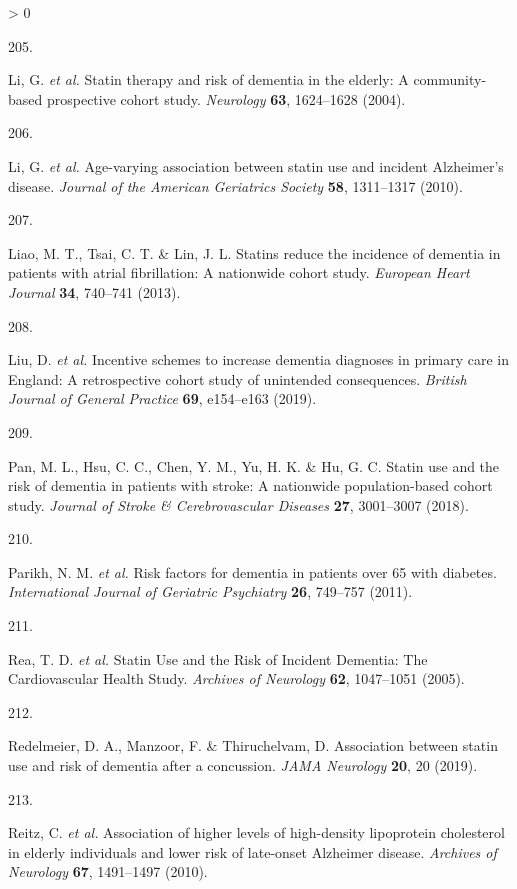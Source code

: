 \documentclass[a4paper, twoside]{templates/ociamthesis}
\newlength{\cslhangindent}
\newlength{\csllabelwidth}
\newenvironment{CSLReferences}[3] %
 {%
  \setlength{\parindent}{0pt}
  \ifodd #1 \everypar{\setlength{\hangindent}{\cslhangindent}}\ignorespaces\fi
  \ifnum #2 > 0
  \setlength{\parskip}{#2\baselineskip}
  \fi
 }%
 {}
\newcommand{\CSLLeftMargin}[1]{\parbox[t]{\maxof{\widthof{#1}}{\csllabelwidth}}{#1}}
\newcommand{\CSLRightInline}[1]{\parbox[t]{\linewidth - \csllabelwidth}{#1}}
\begin{document}
\begin{CSLReferences}{0}{0}
\leavevmode\hypertarget{ref-li2004}{}%
\CSLLeftMargin{205. }
\CSLRightInline{Li, G. \emph{et al.} Statin therapy and risk of dementia in the elderly: A community-based prospective cohort study. \emph{Neurology} \textbf{63}, 1624--1628 (2004).}

\leavevmode\hypertarget{ref-li2010}{}%
\CSLLeftMargin{206. }
\CSLRightInline{Li, G. \emph{et al.} Age-varying association between statin use and incident {Alzheimer}'s disease. \emph{Journal of the American Geriatrics Society} \textbf{58}, 1311--1317 (2010).}

\leavevmode\hypertarget{ref-liao2013}{}%
\CSLLeftMargin{207. }
\CSLRightInline{Liao, M. T., Tsai, C. T. \& Lin, J. L. Statins reduce the incidence of dementia in patients with atrial fibrillation: A nationwide cohort study. \emph{European Heart Journal} \textbf{34}, 740--741 (2013).}

\leavevmode\hypertarget{ref-liu2019}{}%
\CSLLeftMargin{208. }
\CSLRightInline{Liu, D. \emph{et al.} Incentive schemes to increase dementia diagnoses in primary care in {England}: A retrospective cohort study of unintended consequences. \emph{British Journal of General Practice} \textbf{69}, e154--e163 (2019).}

\leavevmode\hypertarget{ref-pan2018}{}%
\CSLLeftMargin{209. }
\CSLRightInline{Pan, M. L., Hsu, C. C., Chen, Y. M., Yu, H. K. \& Hu, G. C. Statin use and the risk of dementia in patients with stroke: A nationwide population-based cohort study. \emph{Journal of Stroke \& Cerebrovascular Diseases} \textbf{27}, 3001--3007 (2018).}

\leavevmode\hypertarget{ref-parikh2011}{}%
\CSLLeftMargin{210. }
\CSLRightInline{Parikh, N. M. \emph{et al.} Risk factors for dementia in patients over 65 with diabetes. \emph{International Journal of Geriatric Psychiatry} \textbf{26}, 749--757 (2011).}

\leavevmode\hypertarget{ref-rea2005}{}%
\CSLLeftMargin{211. }
\CSLRightInline{Rea, T. D. \emph{et al.} Statin {Use} and the {Risk} of {Incident Dementia}: The {Cardiovascular Health Study}. \emph{Archives of Neurology} \textbf{62}, 1047--1051 (2005).}

\leavevmode\hypertarget{ref-redelmeier2019}{}%
\CSLLeftMargin{212. }
\CSLRightInline{Redelmeier, D. A., Manzoor, F. \& Thiruchelvam, D. Association between statin use and risk of dementia after a concussion. \emph{JAMA Neurology} \textbf{20}, 20 (2019).}

\leavevmode\hypertarget{ref-reitz2010}{}%
\CSLLeftMargin{213. }
\CSLRightInline{Reitz, C. \emph{et al.} Association of higher levels of high-density lipoprotein cholesterol in elderly individuals and lower risk of late-onset {Alzheimer} disease. \emph{Archives of Neurology} \textbf{67}, 1491--1497 (2010).}


\end{CSLReferences}
\end{document}

